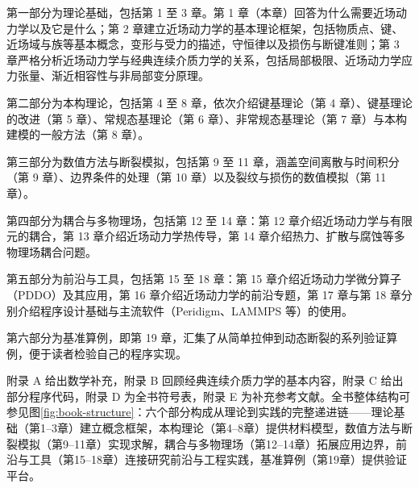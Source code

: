 第一部分为理论基础，包括第 1 至 3 章。第 1 章（本章）回答为什么需要近场动力学以及它是什么；第 2 章建立近场动力学的基本理论框架，包括物质点、键、近场域与族等基本概念，变形与受力的描述，守恒律以及损伤与断键准则；第 3 章严格分析近场动力学与经典连续介质力学的关系，包括局部极限、近场动力学应力张量、渐近相容性与非局部变分原理。

第二部分为本构理论，包括第 4 至 8 章，依次介绍键基理论（第 4 章）、键基理论的改进（第 5 章）、常规态基理论（第 6 章）、非常规态基理论（第 7 章）与本构建模的一般方法（第 8 章）。

第三部分为数值方法与断裂模拟，包括第 9 至 11 章，涵盖空间离散与时间积分（第 9 章）、边界条件的处理（第 10 章）以及裂纹与损伤的数值模拟（第 11 章）。

第四部分为耦合与多物理场，包括第 12 至 14 章：第 12 章介绍近场动力学与有限元的耦合，第 13 章介绍近场动力学热传导，第 14 章介绍热力、扩散与腐蚀等多物理场耦合问题。

第五部分为前沿与工具，包括第 15 至 18 章：第 15 章介绍近场动力学微分算子（PDDO）及其应用，第 16 章介绍近场动力学的前沿专题，第 17 章与第 18 章分别介绍程序设计基础与主流软件（Peridigm、LAMMPS 等）的使用。

第六部分为基准算例，即第 19 章，汇集了从简单拉伸到动态断裂的系列验证算例，便于读者检验自己的程序实现。

附录 A 给出数学补充，附录 B 回顾经典连续介质力学的基本内容，附录 C 给出部分程序代码，附录 D 为全书符号表，附录 E 为补充参考文献。全书整体结构可参见图\ref{fig:book-structure}：六个部分构成从理论到实践的完整递进链——理论基础（第1--3章）建立概念框架，本构理论（第4--8章）提供材料模型，数值方法与断裂模拟（第9--11章）实现求解，耦合与多物理场（第12--14章）拓展应用边界，前沿与工具（第15--18章）连接研究前沿与工程实践，基准算例（第19章）提供验证平台。

